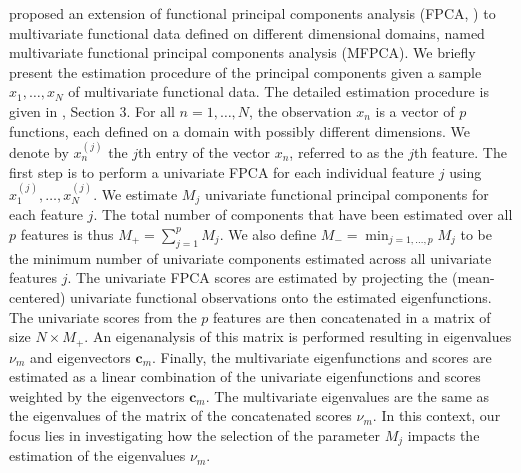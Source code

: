 \cite{happMultivariateFunctionalPrincipal2018} proposed an extension of functional principal components analysis (FPCA, \cite{ramsayFunctionalDataAnalysis2005}) to multivariate functional data defined on different dimensional domains, named multivariate functional principal components analysis (MFPCA). We briefly present the estimation procedure of the principal components given a sample $x_1, \dots, x_N$ of multivariate functional data. The detailed estimation procedure is given in \cite{happMultivariateFunctionalPrincipal2018}, Section 3. For all $n = 1, \dots, N$, the observation $x_n$ is a vector of $p$ functions, each defined on a domain with possibly different dimensions. We denote by $x_n^{(j)}$ the $j$th entry of the vector $x_n$, referred to as the $j$th feature. The first step is to perform a univariate FPCA for each individual feature $j$ using $x_1^{(j)}, \dots, x_N^{(j)}$. We estimate $M_j$ univariate functional principal components for each feature $j$. The total number of components that have been estimated over all $p$ features is thus $M_+ = \sum_{j = 1}^p M_j$. We also define $M_{-} = \min_{j = 1, \dots, p} M_j$ to be the minimum number of univariate components estimated across all univariate features $j$. The univariate FPCA scores are estimated by projecting the (mean-centered) univariate functional observations onto the estimated eigenfunctions. The univariate scores from the $p$ features are then concatenated in a matrix of size $N \times M_+$. An eigenanalysis of this matrix is performed resulting in eigenvalues $\nu_m$ and eigenvectors $\mathbf{c}_m$. Finally, the multivariate eigenfunctions and scores are estimated as a linear combination of the univariate eigenfunctions and scores weighted by the eigenvectors $\mathbf{c}_m$. The multivariate eigenvalues are the same as the eigenvalues of the matrix of the concatenated scores $\nu_m$. In this context, our focus lies in investigating how the selection of the parameter $M_j$ impacts the estimation of the eigenvalues $\nu_m$.


